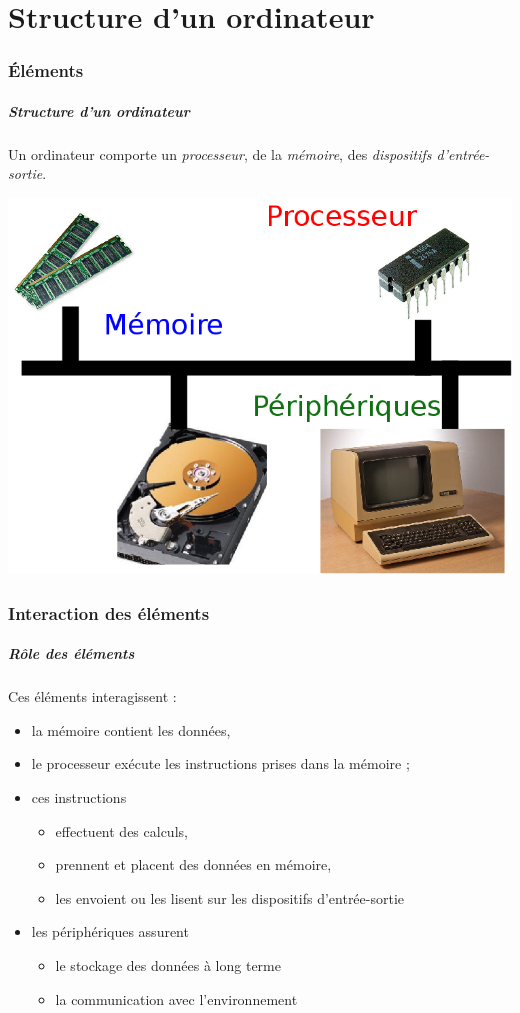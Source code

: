 
\part{Structure d'un ordinateur}

\section{Éléments}

\begin{frame}
\frametitle{Structure d'un ordinateur}


Un ordinateur comporte
un \emph{processeur},
de la \emph{mémoire}, 
des \emph{dispositifs d'entrée-sortie}.

\includegraphics[width=0.8\linewidth]{figures/proc-mem-periph}

\end{frame}

\section{Interaction des éléments}
\begin{frame}
\frametitle{Rôle des éléments}
Ces éléments interagissent : 
\begin{itemize}
\item la \alert{mémoire} contient les \alert{données},
\item le \alert{processeur} exécute les \alert{instructions}
prises dans la mémoire ;
\item ces instructions 
\begin{itemize}
\item effectuent des calculs, 
\item prennent et placent des données 
en mémoire, 
\item les envoient ou les lisent sur les dispositifs d'entrée-sortie
\end{itemize}
\item les \alert{périphériques} assurent
\begin{itemize}
\item le stockage des données à long terme
\item la communication avec l'environnement
\end{itemize}
\end{itemize}

\end{frame}


